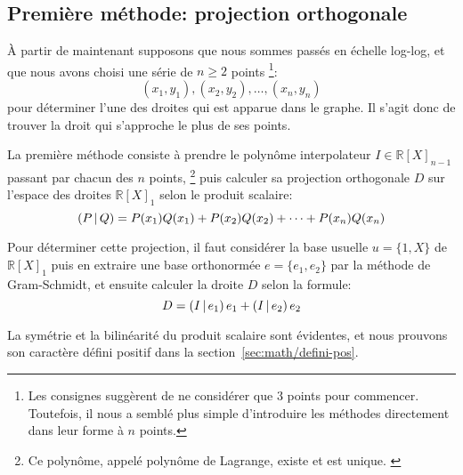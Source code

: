\subsection{Première méthode: projection orthogonale}

À partir de maintenant supposons que nous sommes passés en échelle log-log,
et que nous avons choisi une série de $n\geq 2$ points%
\footnote{
    Les consignes suggèrent de ne considérer que 3 points pour commencer.
    Toutefois, il nous a semblé plus simple d'introduire les méthodes
    directement dans leur forme à $n$ points.
}:
\[
    (x_1,y_1),(x_2,y_2),\ldots,(x_n,y_n)
\]
pour déterminer l'une des droites qui est apparue dans le graphe.
Il s'agit donc de trouver la droit qui s'approche le plus de ses points.

La première méthode consiste à prendre le polynôme interpolateur
$I \in \mathbb{R}[X]_{n-1}$ passant par chacun des $n$ points,%
\footnote{
    Ce polynôme, appelé polynôme de Lagrange, existe et est unique.%
    \cite{lagrange-poly}
}
puis calculer sa projection orthogonale $D$
sur l'espace des droites $\mathbb{R}[X]_1$
selon le produit scalaire:
\begin{equation}
    \left(P\,\middle|\,Q\right) = P(x_1)Q(x_1) + P(x_2)Q(x_2) + \cdots + P(x_n)Q(x_n)
\end{equation}

Pour déterminer cette projection, il faut considérer la base usuelle
$u=\{1,X\}$ de $\mathbb{R}[X]_1$
puis en extraire une base orthonormée $e=\{e_1,e_2\}$ par la méthode
de Gram-Schmidt, et ensuite calculer la droite $D$
selon la formule:
\begin{equation}
    D = \left(I\,\middle|\,e_1\right)e_1 + \left(I\,\middle|\,e_2\right)e_2
\end{equation}

La symétrie et la bilinéarité du produit scalaire sont évidentes,
et nous prouvons son caractère défini positif dans
la section~\ref{sec:math/defini-pos}.
